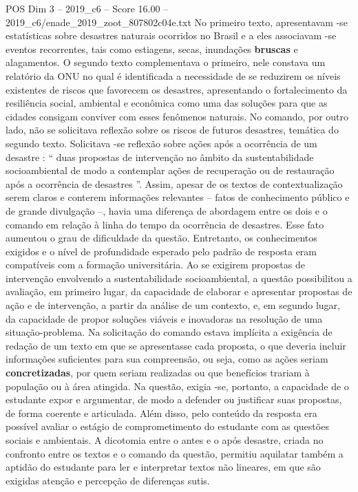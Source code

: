 \begin{textsample}{POS Dim 3 – 2019\_c6 – Score 16.00 – 2019\_c6/enade\_2019\_zoot\_807802c04e.txt}
No primeiro texto, apresentavam -se estatísticas sobre desastres naturais ocorridos no Brasil e a eles associavam -se eventos recorrentes, tais como estiagens, secas, inundações \textbf{bruscas} e alagamentos.
O segundo texto complementava o primeiro, nele constava um relatório da ONU no qual é identificada a necessidade de se reduzirem os níveis existentes de riscos que favorecem os desastres, apresentando o fortalecimento da resiliência social, ambiental e econômica como uma das soluções para que as cidades consigam conviver com esses fenômenos naturais.
No comando, por outro lado, não se solicitava reflexão sobre os riscos de futuros desastres, temática do segundo texto.
Solicitava -se reflexão sobre ações após a ocorrência de um desastre : “ duas propostas de intervenção no âmbito da sustentabilidade socioambiental de modo a contemplar ações de recuperação ou de restauração após a ocorrência de desastres ”.
Assim, apesar de os textos de contextualização serem claros e conterem informações relevantes – fatos de conhecimento público e de grande divulgação –, havia uma diferença de abordagem entre os dois e o comando em relação à linha do tempo da ocorrência de desastres.
Esse fato aumentou o grau de dificuldade da questão.
Entretanto, os conhecimentos exigidos e o nível de profundidade esperado pelo padrão de resposta eram compatíveis com a formação universitária.
Ao se exigirem propostas de intervenção envolvendo a sustentabilidade socioambiental, a questão possibilitou a avaliação, em primeiro lugar, da capacidade de elaborar e apresentar propostas de ação e de intervenção, a partir da análise de um contexto, e, em segundo lugar, da capacidade de propor soluções viáveis e inovadoras na resolução de uma situação-problema.
Na solicitação do comando estava implícita a exigência de redação de um texto em que se apresentasse cada proposta, o que deveria incluir informações suficientes para sua compreensão, ou seja, como as ações seriam \textbf{concretizadas}, por quem seriam realizadas ou que benefícios trariam à população ou à área atingida.
Na questão, exigia -se, portanto, a capacidade de o estudante expor e argumentar, de modo a defender ou justificar suas propostas, de forma coerente e articulada.
Além disso, pelo conteúdo da resposta era possível avaliar o estágio de comprometimento do estudante com as questões sociais e ambientais.
A dicotomia entre o antes e o após desastre, criada no confronto entre os textos e o comando da questão, permitiu aquilatar também a aptidão do estudante para ler e interpretar textos não lineares, em que são exigidas atenção e percepção de diferenças sutis.

\end{textsample}
